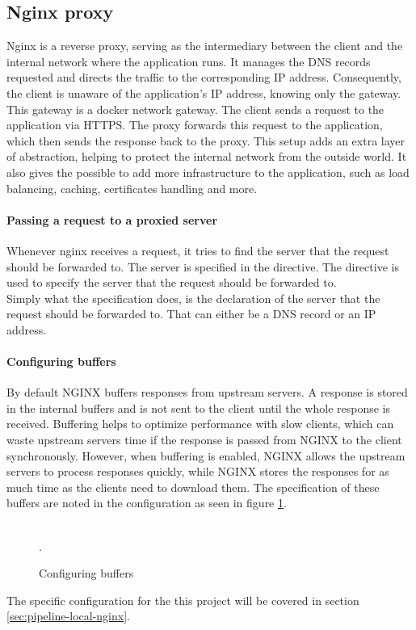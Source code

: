 \subsection{Nginx proxy}
\label{sec:nginx}
Nginx is a reverse proxy, serving as the intermediary between the client and the internal network where the application runs. 
It manages the DNS records requested and directs the traffic to the corresponding IP address. 
Consequently, the client is unaware of the application's IP address, knowing only the gateway. This gateway is a docker network gateway.
The client sends a request to the application via HTTPS. 
The proxy forwards this request to the application, which then sends the response back to the proxy. 
This setup adds an extra layer of abstraction, helping to protect the internal network from the outside world.
It also gives the possible to add more infrastructure to the application, such as load balancing, caching, certificates handling and more.\\

\paragraph{Passing a request to a proxied server}
Whenever nginx receives a request, it tries to find the server that the request should be forwarded to.
The server is specified in the  directive. The  directive is used to specify the server that the request should be forwarded to.\\
Simply what the  specification does, is the declaration of the server that the request should be forwarded to.
That can either be a \ac{DNS} record or an \ac{IP} address.\cite{nginx-proxy-3}

\paragraph{Configuring buffers}By default NGINX buffers responses from upstream servers.
A response is stored in the internal buffers and is not sent to
the client until the whole response is received. Buffering helps to optimize performance with slow clients, 
which can waste upstream servers time if the response is passed from NGINX to the client synchronously. 
However, when buffering is enabled, NGINX allows the upstream servers to 
process responses quickly, while NGINX stores the responses for as much time as the clients need to download them.\cite{nginx-proxy-3}
The specification of these buffers are noted in the configuration as seen in figure \ref{fig:buffer-config}.
\begin{figure}
    \begin{center}
         \\
        .
    \end{center}
    \caption{Configuring buffers}
    \label{fig:buffer-config}
\end{figure}
The specific configuration for the this project will be covered in section \ref{sec:pipeline-local-nginx}.

